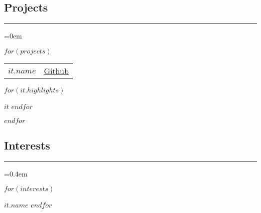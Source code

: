 \documentclass[10pt,letterpaper]{article}
\makeatletter
\def\sectionSpace{\vspace{-10pt}}
\newcommand\resumesection[1]
{\subsection*{#1}
\vspace{-0.2em}
\hrule
\vspace{0.4em}}
\newcommand\headerrow[2]
{\begin{tabular*}{\linewidth}{l@{\extracolsep{\fill}}r}
    #1 &
	#2 \\
\end{tabular*}}
\makeatother
\begin{document}
\resumesection{Projects}
\parskip=0em

    $for(projects)$
    \headerrow
		{\textbf{$it.name$}}
        {\href{$it.url$}{Github}}
    \vspace{-16pt}
	\begin{itemize*}
        $for(it.highlights)$
	    \item $it$
        $endfor$
	\end{itemize*}
	\vspace{-2pt}
    $endfor$
	\sectionSpace

\resumesection{Interests}
\parskip=0.4em

    \begin{itemize*}
        $for(interests)$
        \item $it.name$
        $endfor$
    \end{itemize*}
\end{document}

